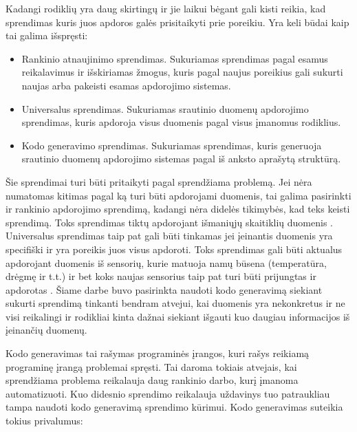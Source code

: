 \documentclass{VUMIFPSbakalaurinis}
\begin{document}
\par
Kadangi rodiklių yra daug skirtingų ir jie laikui bėgant gali kisti reikia, kad sprendimas kuris juos apdoros galės prisitaikyti prie poreikiu. Yra keli būdai kaip tai galima išspręsti:
\begin{itemize}
    \item Rankinio atnaujinimo sprendimas. Sukuriamas sprendimas pagal esamus reikalavimus ir išskiriamas žmogus, kuris pagal naujus poreikius gali sukurti naujas arba pakeisti esamas apdorojimo sistemas. 
    \item Universalus sprendimas. Sukuriamas srautinio duomenų apdorojimo sprendimas, kuris apdoroja visus duomenis pagal visus įmanomus rodiklius.
    \item Kodo generavimo sprendimas. Sukuriamas sprendimas, kuris generuoja srautinio duomenų apdorojimo sistemas pagal iš anksto aprašytą struktūrą.  
\end{itemize}   
Šie sprendimai turi būti pritaikyti pagal sprendžiama problemą. Jei nėra numatomas kitimas pagal ką turi būti apdorojami duomenis, tai galima pasirinkti ir rankinio apdorojimo sprendimą, kadangi nėra didelės tikimybės, kad teks keisti sprendimą. Toks sprendimas tiktų apdorojant išmaniųjų skaitiklių duomenis \cite{skaitikliai}. Universalus sprendimas taip pat gali būti tinkamas jei įeinantis duomenis yra specifiški ir yra poreikis juos visus apdoroti. Toks sprendimas gali būti aktualus apdorojant duomenis iš sensorių, kurie matuoja namų būsena (temperatūra, drėgmę ir t.t.) ir bet koks naujas sensorius taip pat turi būti prijungtas ir apdorotas \cite{yang2017iot}. Šiame darbe buvo pasirinkta naudoti kodo generavimą siekiant sukurti sprendimą tinkanti bendram atvejui, kai duomenis yra nekonkretus ir ne visi reikalingi ir rodikliai kinta dažnai siekiant išgauti kuo daugiau informacijos iš įeinančių duomenų. \par
Kodo generavimas tai rašymas programinės įrangos, kuri rašys reikiamą programinę įrangą problemai spręsti. Tai daroma tokiais atvejais, kai sprendžiama problema reikalauja daug rankinio darbo, kurį įmanoma automatizuoti. Kuo didesnio sprendimo reikalauja uždavinys tuo patraukliau tampa naudoti kodo generavimą sprendimo kūrimui. Kodo generavimas suteikia tokius privalumus: 
\end{document}
